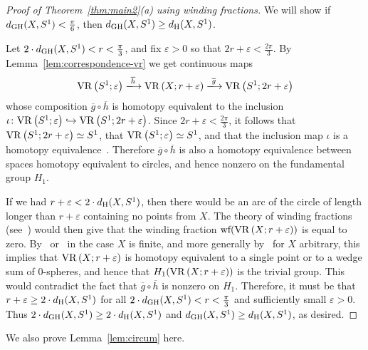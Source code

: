 \documentclass[11pt, reqno, english]{amsart}
\newcommand{\og}{\overline{g}}
\newcommand{\oh}{\overline{h}}
\begin{document}
\begin{proof}[Proof of Theorem~\ref{thm:main2}(a) using winding fractions]

We will show if $d_{\mathrm{GH}}(X,S^1)<\frac{\pi}{6}$, then $d_{\mathrm{GH}}(X,S^1)\geq d_{\mathrm{H}}(X,S^1)$.

Let $2\cdot d_{\mathrm{GH}}(X,S^1) < r < \frac{\pi}{3}$, and fix $\varepsilon>0$ so that $2r+\varepsilon < \frac{2\pi}{3}$.
By Lemma~\ref{lem:correspondence-vr} we get continuous maps
\[\vr{S^1}{\varepsilon} \xlongrightarrow{\oh} \vr{X}{r+\varepsilon} \xlongrightarrow{\og} \vr{S^1}{2r+\varepsilon}\]
whose composition $\og \circ \oh$ is homotopy equivalent to the inclusion $\iota \colon \mathrm{VR}\left(S^1;\varepsilon\right) \hookrightarrow \mathrm{VR}\left(S^1;2r+\varepsilon\right)$.
Since $2r+\varepsilon<\frac{2\pi}{3}$, it follows that $\mathrm{VR}\left(S^1;2r+\varepsilon\right)\simeq S^1$, that $\mathrm{VR}\left(S^1;\varepsilon\right)\simeq S^1$, and that the inclusion map $\iota$ is a homotopy equivalence~\cite{AA-VRS1}.
Therefore $\og \circ \oh$ is also a homotopy equivalence between spaces homotopy equivalent to circles, and hence nonzero on the fundamental group $H_1$.

If we had $r+\varepsilon < 2\cdot d_{\mathrm{H}}(X,S^1)$, then there would be an arc of the circle of length longer than $r+\varepsilon$ containing no points from $X$.
The theory of winding fractions (see~\cite{AA-VRS1,AAM})
would then give that the winding fraction $\textrm{wf}(\mathrm{VR}\left(X;r+\varepsilon\right))$ is equal to zero.
By~\cite[Corollary~4.5]{AA-VRS1} or~\cite[Proposition~6.4]{AAM} in the case $X$ is finite, and more generally by~\cite[Proposition~7.5]{AA-VRS1} for $X$ arbitrary, this implies that $\mathrm{VR}\left(X;r+\varepsilon\right)$ is homotopy equivalent to a single point or to a wedge sum of $0$-spheres, and hence that $H_1(\mathrm{VR}\left(X;r+\varepsilon\right))$ is the trivial group.
This would contradict the fact that $\og \circ \oh$ is nonzero on $H_1$.
Therefore, it must be that $r+\varepsilon \ge 2\cdot d_{\mathrm{H}}(X,S^1)$ for all $2\cdot d_{\mathrm{GH}}(X,S^1) < r < \frac{\pi}{3}$ and sufficiently small $\varepsilon>0$.
Thus $2\cdot d_{\mathrm{GH}}(X,S^1) \ge 2\cdot d_{\mathrm{H}}(X,S^1)$ and $d_{\mathrm{GH}}(X,S^1) \ge d_{\mathrm{H}}(X,S^1)$, as desired.

\end{proof}

We also prove Lemma~\ref{lem:circum} here.
\end{document}
